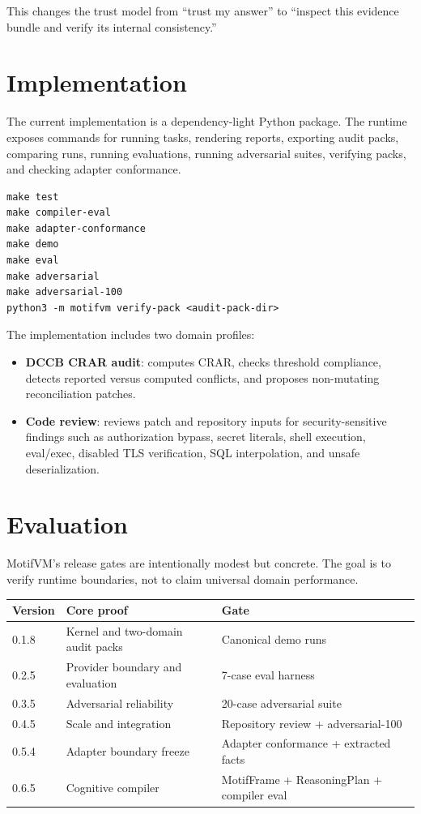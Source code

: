 \documentclass[11pt]{article}
\begin{document}
This changes the trust model from ``trust my answer'' to ``inspect this evidence bundle and verify its internal consistency.''

\section{Implementation}

The current implementation is a dependency-light Python package. The runtime exposes commands for running tasks, rendering reports, exporting audit packs, comparing runs, running evaluations, running adversarial suites, verifying packs, and checking adapter conformance.

\begin{verbatim}
make test
make compiler-eval
make adapter-conformance
make demo
make eval
make adversarial
make adversarial-100
python3 -m motifvm verify-pack <audit-pack-dir>
\end{verbatim}

The implementation includes two domain profiles:

\begin{itemize}[leftmargin=1.5em]
  \item \textbf{DCCB CRAR audit}: computes CRAR, checks threshold compliance, detects reported versus computed conflicts, and proposes non-mutating reconciliation patches.
  \item \textbf{Code review}: reviews patch and repository inputs for security-sensitive findings such as authorization bypass, secret literals, shell execution, eval/exec, disabled TLS verification, SQL interpolation, and unsafe deserialization.
\end{itemize}

\section{Evaluation}

MotifVM's release gates are intentionally modest but concrete. The goal is to verify runtime boundaries, not to claim universal domain performance.

\begin{center}
\begin{tabular}{lll}
\toprule
\textbf{Version} & \textbf{Core proof} & \textbf{Gate} \\
\midrule
0.1.8 & Kernel and two-domain audit packs & Canonical demo runs \\
0.2.5 & Provider boundary and evaluation & 7-case eval harness \\
0.3.5 & Adversarial reliability & 20-case adversarial suite \\
0.4.5 & Scale and integration & Repository review + adversarial-100 \\
0.5.4 & Adapter boundary freeze & Adapter conformance + extracted facts \\
0.6.5 & Cognitive compiler & MotifFrame + ReasoningPlan + compiler eval \\
\bottomrule
\end{tabular}
\end{center}
\end{document}
